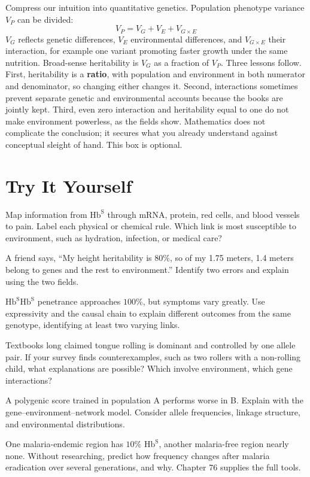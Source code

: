 \begin{tiaozhan}
Compress our intuition into quantitative genetics. Population phenotype variance $V_P$ can be divided:
\[V_P = V_G + V_E + V_{G\times E}\]
$V_G$ reflects genetic differences, $V_E$ environmental differences, and $V_{G\times E}$ their interaction, for example one variant promoting faster growth under the same nutrition. Broad-sense heritability is $V_G$ as a fraction of $V_P$. Three lessons follow. First, heritability is a \textbf{ratio}, with population and environment in both numerator and denominator, so changing either changes it. Second, interactions sometimes prevent separate genetic and environmental accounts because the books are jointly kept. Third, even zero interaction and heritability equal to one do not make environment powerless, as the fields show. Mathematics does not complicate the conclusion; it secures what you already understand against conceptual sleight of hand. This box is optional.
\end{tiaozhan}

\section*{Try It Yourself}

\begin{sikaoti}
\item Map information from $\mathrm{Hb^{S}}$ through mRNA, protein, red cells, and blood vessels to pain. Label each physical or chemical rule. Which link is most susceptible to environment, such as hydration, infection, or medical care?
\item A friend says, ``My height heritability is $80\%$, so of my 1.75 meters, 1.4 meters belong to genes and the rest to environment.'' Identify two errors and explain using the two fields.
\item $\mathrm{Hb^{S}Hb^{S}}$ penetrance approaches $100\%$, but symptoms vary greatly. Use expressivity and the causal chain to explain different outcomes from the same genotype, identifying at least two varying links.
\item Textbooks long claimed tongue rolling is dominant and controlled by one allele pair. If your survey finds counterexamples, such as two rollers with a non-rolling child, what explanations are possible? Which involve environment, which gene interactions?
\item A polygenic score trained in population A performs worse in B. Explain with the gene--environment--network model. Consider allele frequencies, linkage structure, and environmental distributions.
\item One malaria-endemic region has $10\%$ $\mathrm{Hb^{S}}$, another malaria-free region nearly none. Without researching, predict how frequency changes after malaria eradication over several generations, and why. Chapter 76 supplies the full tools.
\end{sikaoti}

